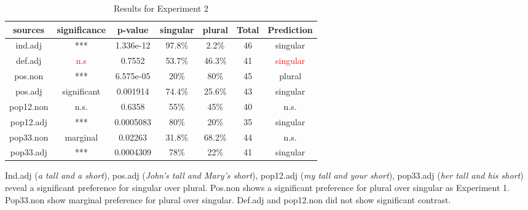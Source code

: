 \documentclass[
  11pt          %
  ,letterpaper  %
  ,center       %
  ,noupper      %
  ]{uconnthesis2}
\begin{document}
\begin{table}[h!] \small \centering
{
\begin{tabular}{ | c | c | c | c | c | c | c |} \hline 
sources		&	significance	&	p-value 		& 	singular				&	plural				&	Total	&	Prediction \\ \hline
ind.adj		&	***			&	1.336e-12		&	\cellcolor{yellow}97.8\%	&	2.2\%				&	46	&	singular \\ \hline
def.adj		&	\textcolor{red}{n.s}			&	0.7552		&	53.7\%				&	46.3\%	&	41	&	\textcolor{red}{singular} \\ \hline
pos.non		&	***			&	6.575e-05		&	20\%					&	\cellcolor{yellow}80\%	&	45	&	plural\\ \hline
pos.adj		&	significant		&	0.001914		&	\cellcolor{yellow}74.4\%	&	25.6\%				&	43	&	singular\\ \hline
pop12.non	&	n.s.			&	0.6358		&	55\%					&	45\%					&	40	&	n.s.\\ \hline
pop12.adj		&	***			&	0.0005083	&	\cellcolor{yellow}80\%	&	20\%					&	35	&	singular \\ \hline
pop33.non	&	marginal		&	0.02263		&	31.8\%	&	\cellcolor{yellow}68.2\% 	&	44	&	n.s.	\\ \hline
pop33.adj		&	***			&	0.0004309	&	\cellcolor{yellow}78\%	&	22\%					&	41	&	singular \\ \hline
\end{tabular}}
\caption{Results for Experiment 2} \label{tab:ch3exp2a}
\end{table} 

Ind.adj (\textit{a tall and a short}), pos.adj (\textit{John's tall and Mary's short}), pop12.adj (\textit{my tall and your short}), pop33.adj (\textit{her tall and his short}) reveal a significant preference for singular over plural. Pos.non shows a significant preference for plural over singular as Experiment 1. Pop33.non show marginal preference for plural over singular. Def.adj and pop12.non did not show significant contrast. 
\end{document}
